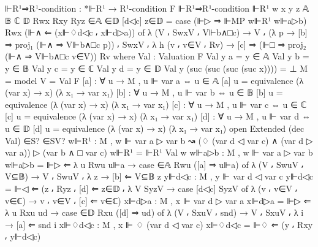 \begin{spverbatim}
  ⊩R¹⇒R¹-condition : *⊩R¹ → R¹-condition F
  ⊩R¹⇒R¹-condition ⊩R¹ {w} {x} {y} {z} {𝔸} {𝔹} {ℂ} {𝔻}
    Rwx Rxy Ryz ∈𝔸 ∈𝔻 [d◁c] z∈𝔻 = case (⊩▷ ⇒ ⊩MP w⊩R¹ w⊩a▷b) Rwx (⊩∧ ⇐ (x⊩♢d◁c ⸴ x⊩d▷a)) of
    λ { (V ⸴ SwxV ⸴ V⊩b∧□c) → V ⸴ (λ {p → [b] ⇒ proj₁ (⊩∧ ⇒ V⊩b∧□c p)}) ⸴ SwxV ⸴
    λ { {h} (v ⸴ v∈V ⸴ Rv) → [c] ⇒ (⊩□ ⇒ proj₂ (⊩∧ ⇒ V⊩b∧□c v∈V)) Rv}}
    where
    Val : Valuation F
    Val y a = y ∈ 𝔸
    Val y b = y ∈ 𝔹
    Val y c = y ∈ ℂ
    Val y d = y ∈ 𝔻
    Val y (suc (suc (suc (suc x)))) = ⊥
    M = model {V = Val} F
    [a] : ∀ {u} → M , u ⊩ var a ⇔ u ∈ 𝔸
    [a] {u} = equivalence (λ { (var x) → x}) (λ x₁ → var x₁)
    [b] : ∀ {u} → M , u ⊩ var b ⇔ u ∈ 𝔹
    [b] {u} = equivalence (λ { (var x) → x}) (λ x₁ → var x₁)
    [c] : ∀ {u} → M , u ⊩ var c ⇔ u ∈ ℂ
    [c] {u} = equivalence (λ { (var x) → x}) (λ x₁ → var x₁)
    [d] : ∀ {u} → M , u ⊩ var d ⇔ u ∈ 𝔻
    [d] {u} = equivalence (λ { (var x) → x}) (λ x₁ → var x₁)
    open Extended (dec Val) ∈S? ∈SV?
    w⊩R¹ : M , w ⊩ var a ▷ var b ↝ (♢ (var d ◁ var c) ∧ (var d ▷ var a)) ▷ (var b ∧ □ var c)
    w⊩R¹ = ⊩R¹ Val w
    w⊩a▷b : M , w ⊩ var a ▷ var b
    w⊩a▷b = ⊩▷ ⇐ λ { {u} Rwu u⊩a →
      case ∈𝔸 Rwu ([a] ⇒ u⊩a) of λ { (V ⸴ SwuV ⸴ V⊆𝔹)
      → V ⸴ SwuV ⸴ λ {z → [b] ⇐ V⊆𝔹 z}}}
    y⊩d◁c : M , y ⊩ var d ◁ var c
    y⊩d◁c = ⊩◁ ⇐ (z ⸴ Ryz ⸴ [d] ⇐ z∈𝔻 ⸴ λ { {V} SyzV → case [d◁c] SyzV of λ { (v ⸴ v∈V ⸴ v∈ℂ) → v ⸴ v∈V ⸴ [c] ⇐ v∈ℂ}})
    x⊩d▷a : M , x ⊩ var d ▷ var a
    x⊩d▷a = ⊩▷ ⇐ λ { {u} Rxu ud → case ∈𝔻 Rxu ([d] ⇒ ud) of λ { (V ⸴ SxuV ⸴ snd) → V ⸴ SxuV ⸴ λ {i → [a] ⇐ snd i}}}
    x⊩♢d◁c : M , x ⊩ ♢ (var d ◁ var c)
    x⊩♢d◁c = ⊩♢ ⇐ (y ⸴ Rxy ⸴ y⊩d◁c)
\end{spverbatim}
